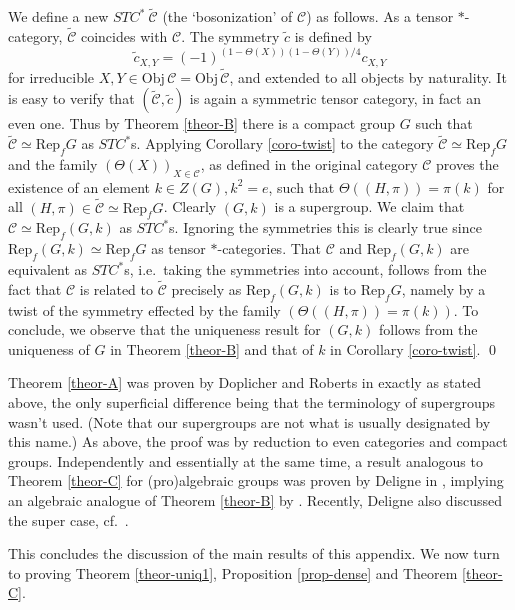 \documentclass[12pt]{article}
\theoremstyle{definition}
\theoremstyle{definition}
\theoremstyle{remark}
\newcommand{\obj}{\mathrm{Obj}}
\def\2#1{{\mathcal #1}}
\newcommand{\Rep}{\mathrm{Rep}}
\begin{document}
\prf We define a new $STC^*\ \widetilde{\2C}$ (the `bosonization' of $\2C$) as follows. As a 
tensor $*$-category, $\widetilde{\2C}$ coincides with $\2C$. The symmetry $\tilde{c}$ is defined by
\[ \tilde{c}_{X,Y}=(-1)^{(1-\Theta(X))(1-\Theta(Y))/4} c_{X,Y} \]
for irreducible $X,Y\in\obj\,\2C=\obj\,\tilde{\2C}$, and extended to all objects by naturality. It is
easy to verify that $(\tilde{\2C},\tilde{c})$ is again a symmetric tensor category, in fact an even 
one. Thus by Theorem \ref{theor-B} there is a compact group $G$ such that $\tilde{\2C}\simeq\Rep_fG$
as $STC^*$s. Applying Corollary \ref{coro-twist} to the category $\tilde{\2C}\simeq\Rep_fG$ and the
family $(\Theta(X))_{X\in\2C}$, as defined in the original category $\2C$ proves the existence of an
element $k\in Z(G), k^2=e$, such that $\Theta((H,\pi))=\pi(k)$ for all
$(H,\pi)\in\tilde{\2C}\simeq\Rep_fG$. Clearly $(G,k)$ is a supergroup. We claim that
$\2C\simeq\Rep_f(G,k)$ as $STC^*$s. Ignoring the symmetries this is clearly true since
$\Rep_f(G,k)\simeq\Rep_fG$ as tensor $*$-categories. That $\2C$ and $\Rep_f(G,k)$ are equivalent
as $STC^*$s, i.e.\ taking the symmetries into account, follows from the fact that $\2C$ is related
to $\tilde{\2C}$ precisely as $\Rep_f(G,k)$ is to $\Rep_fG$, namely by a twist of the symmetry
effected by the family  $(\Theta((H,\pi))=\pi(k))$. To conclude, we observe that the uniqueness result
for $(G,k)$ follows from the uniqueness of $G$ in Theorem \ref{theor-B} and that of $k$ in Corollary
\ref{coro-twist}. 
\qed

\brem Theorem \ref{theor-A} was proven by Doplicher and Roberts in \cite[Section 7]{DR} exactly as
stated above, the only superficial difference being that the terminology of supergroups wasn't
used. (Note that our supergroups are not what is usually designated by this name.) As above, the
proof was by reduction to even categories and compact groups. Independently and 
essentially at the same time, a result analogous to Theorem \ref{theor-C} for (pro)algebraic groups
was proven by Deligne in \cite{del}, implying an algebraic analogue of Theorem \ref{theor-B} by
\cite{SR,DM}. Recently, Deligne also discussed the super case, cf.\ \cite{del3}.
\erem

This concludes the discussion of the main results of this appendix. We now turn to proving
Theorem \ref{theor-uniq1}, Proposition \ref{prop-dense} and Theorem \ref{theor-C}.


\end{document}
